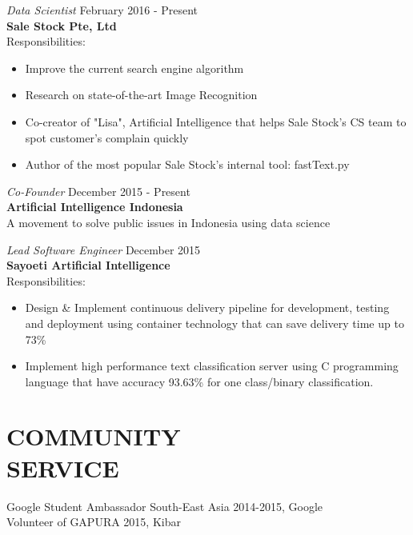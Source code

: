 \documentclass[margin, 10pt]{res} %
\begin{document}
\begin{resume}
{\sl Data Scientist} \hfill February 2016 - Present \\
\textbf{Sale Stock Pte, Ltd} \\
Responsibilities:
\begin{itemize} \itemsep -2pt %
\item Improve the current search engine algorithm
\item Research on state-of-the-art Image Recognition
\item Co-creator of "Lisa", Artificial Intelligence that helps Sale Stock's CS team to spot customer's complain quickly
\item Author of the most popular Sale Stock's internal tool: fastText.py
\end{itemize}

{\sl Co-Founder} \hfill December 2015 - Present \\
\textbf{Artificial Intelligence Indonesia} \\
A movement to solve public issues in Indonesia using data science 
 
{\sl Lead Software Engineer} \hfill December 2015 \\
\textbf{Sayoeti Artificial Intelligence}\\
Responsibilities:
\begin{itemize} \itemsep -2pt %
\item Design \& Implement continuous delivery pipeline for development, testing and deployment using container technology that can save delivery time up to 73\%
\item Implement high performance text classification server using C programming language that have accuracy 93.63\% for one class/binary classification.
\end{itemize}


\section{COMMUNITY\\SERVICE}
Google Student Ambassador South-East Asia 2014-2015, Google\\
Volunteer of GAPURA 2015, Kibar



\end{resume}
\end{document}
